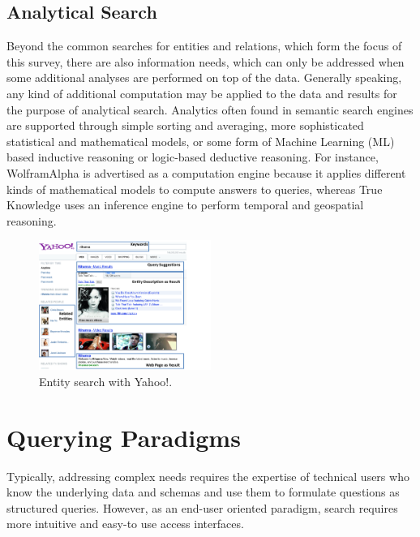  
	
\subsection{Analytical Search}
Beyond the common searches for entities and relations, which form the focus of this survey, there are also information needs, which can only be addressed when some additional analyses are performed on top of the data. Generally speaking, any kind of additional computation may be applied to the data and results for the purpose of analytical search. Analytics often found in semantic search engines are supported through simple sorting and averaging, more sophisticated statistical and mathematical models, or some form of Machine Learning (ML) based inductive reasoning or logic-based deductive reasoning. For instance, WolframAlpha is advertised as a computation engine because it applies different kinds of mathematical models to compute answers to queries, whereas True Knowledge uses an inference engine to perform temporal and geospatial reasoning. 



\begin{figure}
	\centering
		\includegraphics[width=0.5\textwidth]{figs/screenshot_yahoo}
	\caption{Entity search with Yahoo!.}
	\label{fig:screenshot_yahoo}
	\vspace{-0.5cm}
\end{figure}


\section{Querying Paradigms}\label{sec:querying}
Typically, addressing complex needs requires the expertise of technical users who know the underlying data and schemas and use them to formulate questions as structured queries. However, as an end-user oriented paradigm, 
search requires more intuitive and easy-to use access interfaces. 


